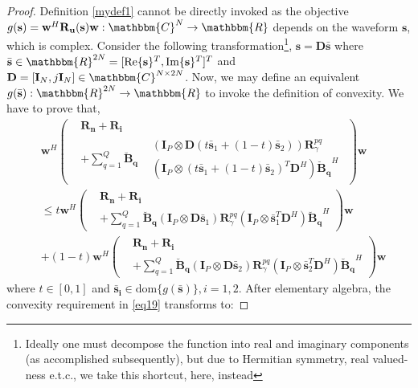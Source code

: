\documentclass[11pt,draftclsnofoot,onecolumn]{IEEEtran}
\theoremstyle{definition}
\theoremstyle{remark}
\begin{document}
\begin{proof}
Definition \ref{mydef1} cannot be directly invoked as the objective $g(\mathbf{s})= \mathbf{w}^H\mathbf{R_u}( \mathbf{s})\mathbf{w}:\mathbbm{C}^N\rightarrow \mathbbm{R}$ depends on the waveform $\mathbf{s}$, which is complex. Consider the following transformation\footnote{Ideally one must decompose the function into real and imaginary components (as accomplished subsequently), but due to Hermitian symmetry, real valued-ness e.t.c., we take this shortcut, here, instead}, $\mathbf{s}=\mathbf{D}\bar{\mathbf{s}}$ where $\bar{\mathbf{s}}\in\mathbbm{R}^{2N}=[\mbox{Re}\{\mathbf{s}\}^T,\mbox{Im}\{\mathbf{s}\}^T] ^T$ and $\mathbf{D}=[\mathbf{I}_N, j\mathbf{I}_N]\in\mathbbm{C}^{N\times2N}$. Now, we may  define an equivalent $g(\bar{\mathbf{s}}) :\mathbbm{R}^{2N}\rightarrow \mathbbm{R}$ to invoke the definition of convexity. We have to prove that,
\begin{align} \label{eq19}
&\mathbf{w}^H \left( \begin{aligned} &\mathbf{R_n}+\mathbf{R_i} \\
&+\sum\limits_{q=1}^Q \mathbf{\breve{B}_q}\begin{aligned} &(\mathbf{I}_P\otimes \mathbf{D}(t\bar{\mathbf{s}}_1+(1-t)\bar{\mathbf{s}}_2 ) )\mathbf{R}_{\gamma}^{pq} \\
&( \mathbf{I}_P\otimes (t\bar{\mathbf{s}}_1+(1-t)\bar{\mathbf{s}}_2 )^T\mathbf{D}^H ) \mathbf{\breve{B}_q}^H \end{aligned}  \end{aligned} \right) \mathbf{w} \nonumber \\
&\leq t \mathbf{w}^H \left(  \begin{aligned} &\mathbf{R_n}+\mathbf{R_i} \\
&+\sum\limits_{q=1}^Q \mathbf{\breve{B}_q}
(\mathbf{I}_P\otimes \mathbf{D}\bar{\mathbf{s}}_1 )\mathbf{R}_{\gamma}^{pq} ( \mathbf{I}_P\otimes \bar{\mathbf{s}}_1^T\mathbf{D}^H ) \mathbf{\breve{B}_q}^H
 \end{aligned} \right) \mathbf{w} \nonumber \\
 &+(1-t)\mathbf{w}^H \left( \begin{aligned} &\mathbf{R_n}+\mathbf{R_i} \\
 &+\sum\limits_{q=1}^Q
\mathbf{\breve{B}_q}(\mathbf{I}_P\otimes \mathbf{D}\bar{\mathbf{s}}_2 )\mathbf{R}_{\gamma}^{pq} ( \mathbf{I}_P\otimes \bar{\mathbf{s}}_2^T\mathbf{D}^H ) \mathbf{\breve{B}_q}^H
  \end{aligned} \right) \mathbf{w} 
\end{align}
where $t\in[0,1]$ and $\mathbf{\bar{s}_i}\in \mbox{dom}\{ g(\bar{\mathbf{s}})\},i=1,2$. After elementary algebra, the convexity  requirement in \eqref{eq19} transforms to:


\end{proof}
\end{document}
